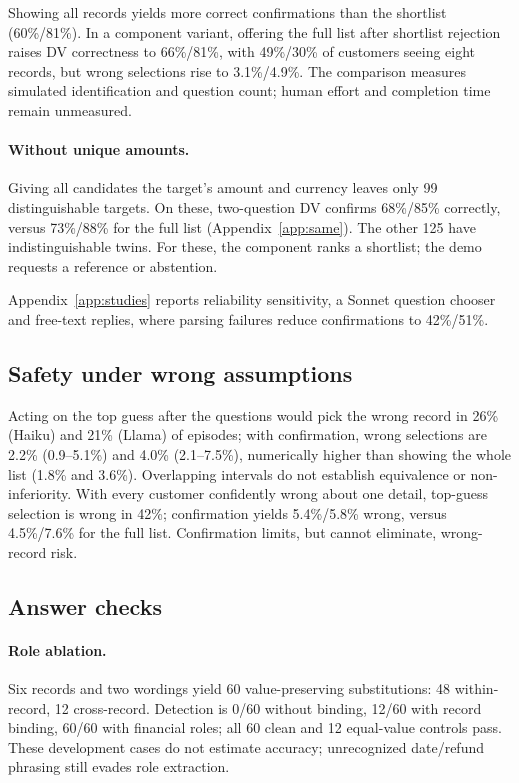 \documentclass[11pt]{article}
\begin{document}
Showing all records yields more correct confirmations than the shortlist (60\%/81\%). In a
component variant, offering the full list after shortlist rejection raises DV correctness to
66\%/81\%, with 49\%/30\% of customers seeing eight records, but wrong selections rise to
3.1\%/4.9\%. The comparison measures
simulated identification and question count; human effort and completion time remain unmeasured.

\paragraph{Without unique amounts.}
\label{sec:same}
Giving all candidates the target's amount and currency leaves only 99 distinguishable targets.
On these, two-question DV confirms 68\%/85\% correctly, versus 73\%/88\% for the full list
(Appendix~\ref{app:same}). The other 125 have indistinguishable twins. For these, the component
ranks a shortlist; the demo requests a reference or abstention.

Appendix~\ref{app:studies} reports reliability sensitivity, a Sonnet question chooser and
free-text replies, where parsing failures reduce confirmations to 42\%/51\%.

\subsection{Safety under wrong assumptions}
\label{sec:safety}

Acting on the top guess after the questions would pick the wrong record in 26\% (Haiku) and
21\% (Llama) of episodes; with confirmation, wrong selections are 2.2\% (0.9--5.1\%) and 4.0\%
(2.1--7.5\%), numerically higher than showing the whole list (1.8\% and 3.6\%). Overlapping
intervals do not establish equivalence or non-inferiority. With every customer confidently wrong
about one detail, top-guess selection is wrong in 42\%; confirmation yields 5.4\%/5.8\% wrong,
versus 4.5\%/7.6\% for the full list. Confirmation limits, but cannot eliminate, wrong-record risk.

\subsection{Answer checks}
\label{sec:inject}

\paragraph{Role ablation.} Six records and two wordings yield 60 value-preserving substitutions:
48 within-record, 12 cross-record. Detection is 0/60 without binding, 12/60 with record binding,
60/60 with financial roles; all 60 clean and 12 equal-value controls pass. These development
cases do not estimate accuracy; unrecognized date/refund phrasing still evades role extraction.
\end{document}
